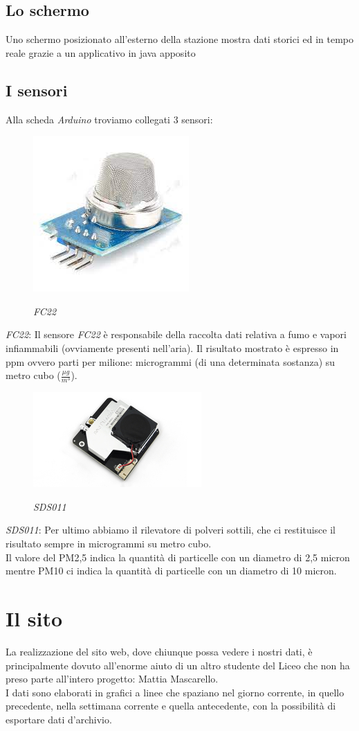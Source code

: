 \documentclass{article}
\begin{document}
\subsection{Lo schermo}
Uno schermo posizionato all'esterno della stazione mostra dati storici ed in tempo reale grazie a un applicativo in java apposito
\subsection{I sensori}
Alla scheda \emph{Arduino} troviamo collegati 3 sensori:
\begin{figure}[h!]
\centering
\includegraphics[]{FC22.png}\\
\caption{\emph{FC22}}
\end{figure}
\emph{FC22}: Il sensore \emph{FC22} è responsabile della raccolta dati relativa a fumo e vapori infiammabili (ovviamente presenti nell’aria). Il risultato mostrato è espresso in ppm ovvero parti per milione: microgrammi (di una determinata sostanza) su metro cubo ($\frac{\mu g}{m^3}$).
\begin{figure}[h!]
\centering
\includegraphics[]{sds011.jpg}\\
\caption{\emph{SDS011}}
\end{figure}
\emph{SDS011}: Per ultimo abbiamo il rilevatore di polveri sottili, che ci restituisce il risultato sempre in microgrammi su metro cubo.\\
Il valore del PM2,5 indica la quantità di particelle con un diametro di 2,5 micron mentre PM10 ci indica la quantità di particelle con un diametro di 10 micron.
\section{Il sito}
La realizzazione del sito web, dove chiunque possa vedere i nostri dati, è principalmente dovuto all’enorme aiuto di un altro studente del Liceo che non ha preso parte all’intero progetto: Mattia Mascarello.\\
I dati sono elaborati in grafici a linee che spaziano nel giorno corrente, in quello precedente, nella settimana corrente e quella antecedente, con la possibilità di esportare dati d'archivio.\\
\end{document}
